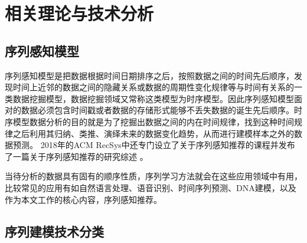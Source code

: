 ﻿%
\chapter{相关理论与技术分析}










\section{序列感知模型}
序列感知模型是把数据根据时间日期排序之后，按照数据之间的时间先后顺序，发现时间上近邻的数据之间的隐藏关系或数据的周期性变化规律等与时间有关系的一类数据挖掘模型，数据挖掘领域又常称这类模型为时序模型。因此序列感知模型面对的数据必须包含时间戳或者数据的存储形式能够不丢失数据的诞生先后顺序。时序模型数据分析的目的就是为了挖掘出数据之间的内在时间规律，找到这种时间规律之后利用其归纳、类推、演绎未来的数据变化趋势，从而进行建模样本之外的数据预测。
2018年的ACM RecSys中还专门设立了关于序列感知推荐的课程并发布了一篇关于序列感知推荐的研究综述
。


当待分析的数据具有固有的顺序性质，序列学习方法就会在这些应用领域中有用，比较常见的应用有如自然语言处理、语音识别、时间序列预测、DNA建模，以及作为本文工作的核心内容，序列感知推荐。


\section{序列建模技术分类}


